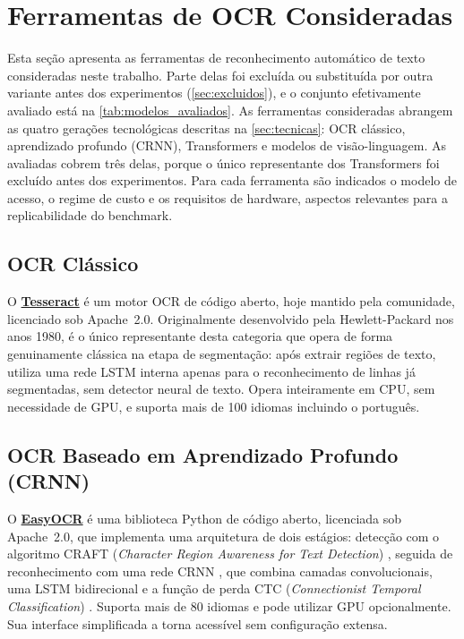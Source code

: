 \documentclass[noabntexcite,oneside]{ufsc-thesis-rn46-2019}
\begin{document}
\section{Ferramentas de OCR Consideradas}
\label{sec:ferramentas}

Esta seção apresenta as ferramentas de reconhecimento automático de texto consideradas
neste trabalho. Parte delas foi excluída ou substituída por outra variante antes dos
experimentos (\autoref{sec:excluidos}), e o conjunto efetivamente avaliado está na
\autoref{tab:modelos_avaliados}. As ferramentas consideradas abrangem as quatro gerações
tecnológicas descritas na \autoref{sec:tecnicas}: OCR clássico, aprendizado profundo (CRNN),
Transformers e modelos de visão-linguagem. As avaliadas cobrem três delas, porque o único
representante dos Transformers foi excluído antes dos experimentos. Para cada ferramenta são indicados o modelo de acesso, o
regime de custo e os requisitos de hardware, aspectos relevantes para a replicabilidade
do benchmark.

\subsection{OCR Clássico}

O \href{https://github.com/tesseract-ocr/tesseract}{\textbf{Tesseract}}
\cite{smith2007} é um motor OCR de código aberto, hoje mantido pela comunidade, licenciado sob
Apache~2.0. Originalmente desenvolvido pela Hewlett-Packard nos anos 1980, é o único
representante desta categoria que opera de forma genuinamente clássica na etapa de
segmentação: após extrair regiões de texto, utiliza uma rede LSTM interna apenas para o
reconhecimento de linhas já segmentadas, sem detector neural de texto. Opera inteiramente
em CPU, sem necessidade de GPU, e suporta mais de 100 idiomas incluindo o português.

\subsection{OCR Baseado em Aprendizado Profundo (CRNN)}

O \href{https://github.com/JaidedAI/EasyOCR}{\textbf{EasyOCR}} \cite{easyocr2020} é
uma biblioteca Python de código aberto, licenciada sob Apache~2.0, que implementa uma
arquitetura de dois estágios: detecção com o algoritmo CRAFT (\textit{Character Region Awareness for Text
Detection}) \cite{baek2019}, seguida de reconhecimento com uma rede CRNN
\cite{shi2017}, que combina camadas convolucionais, uma LSTM bidirecional
\cite{hochreiter1997} e a função de perda CTC (\textit{Connectionist Temporal
Classification}) \cite{graves2006}.
Suporta mais de 80 idiomas e pode utilizar GPU opcionalmente. Sua interface simplificada
a torna acessível sem configuração extensa.
\end{document}
